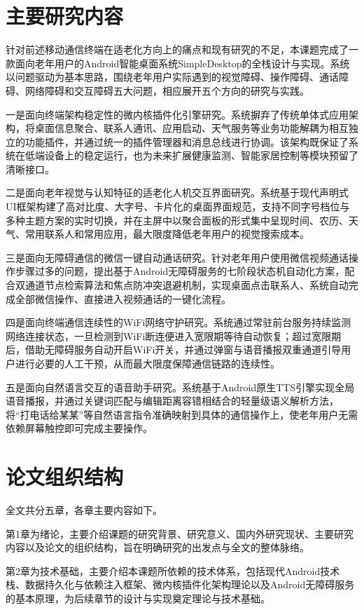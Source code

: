 \section{主要研究内容}
针对前述移动通信终端在适老化方向上的痛点和现有研究的不足，本课题完成了一款面向老年用户的Android智能桌面系统SimpleDesktop的全栈设计与实现。系统以问题驱动为基本思路，围绕老年用户实际遇到的视觉障碍、操作障碍、通话障碍、网络障碍和交互障碍五大问题，相应展开五个方向的研究与实践。

一是面向终端架构稳定性的微内核插件化引擎研究。系统摒弃了传统单体式应用架构，将桌面信息聚合、联系人通讯、应用启动、天气服务等业务功能解耦为相互独立的功能插件，并通过统一的插件管理器和消息总线进行协调。该架构既保证了系统在低端设备上的稳定运行，也为未来扩展健康监测、智能家居控制等模块预留了清晰接口。

二是面向老年视觉与认知特征的适老化人机交互界面研究。系统基于现代声明式UI框架构建了高对比度、大字号、卡片化的桌面界面规范，支持不同字号档位与多种主题方案的实时切换，并在主屏中以聚合面板的形式集中呈现时间、农历、天气、常用联系人和常用应用，最大限度降低老年用户的视觉搜索成本。

三是面向无障碍通信的微信一键自动通话研究。针对老年用户使用微信视频通话操作步骤过多的问题，提出基于Android无障碍服务的七阶段状态机自动化方案，配合双通道节点检索算法和焦点防冲突退避机制，实现桌面点击联系人、系统自动完成全部微信操作、直接进入视频通话的一键化流程。

四是面向终端通信连续性的WiFi网络守护研究。系统通过常驻前台服务持续监测网络连接状态，一旦检测到WiFi断连便进入宽限期等待自动恢复；超过宽限期后，借助无障碍服务自动开启WiFi开关，并通过弹窗与语音播报双重通道引导用户进行必要的人工干预，从而最大限度保障通信链路的连续性。

五是面向自然语言交互的语音助手研究。系统基于Android原生TTS引擎实现全局语音播报，并通过关键词匹配与编辑距离容错相结合的轻量级语义解析方法，将“打电话给某某”等自然语言指令准确映射到具体的通信操作上，使老年用户无需依赖屏幕触控即可完成主要操作。

\section{论文组织结构}
全文共分五章，各章主要内容如下。

第1章为绪论，主要介绍课题的研究背景、研究意义、国内外研究现状、主要研究内容以及论文的组织结构，旨在明确研究的出发点与全文的整体脉络。

第2章为技术基础，主要介绍本课题所依赖的技术体系，包括现代Android技术栈、数据持久化与依赖注入框架、微内核插件化架构理论以及Android无障碍服务的基本原理，为后续章节的设计与实现奠定理论与技术基础。

